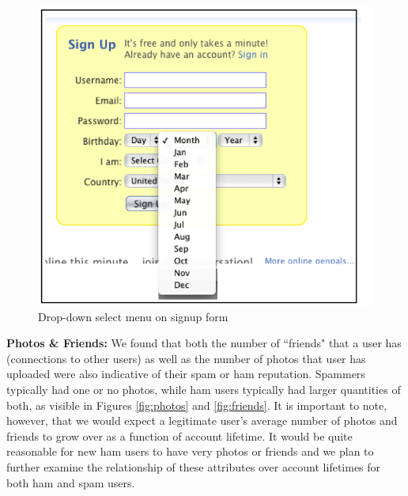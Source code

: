 \documentclass[preprint]{acm_proc_article-sp}
\begin{document}
\begin{figure}[h]
    \centering
    \includegraphics[width=\linewidth]{figures/dropdown.png}
    \caption{Drop-down select menu on signup form}
    \label{fig:drop}
\end{figure}

\textbf{Photos \& Friends:} We found that both the number of ``friends" that a user has (connections 
to other users) as well as the number of photos that user has uploaded were also indicative of their 
spam or ham reputation. Spammers typically had one or no photos, while ham users typically had larger 
quantities of both, as visible in Figures \ref{fig:photos} and \ref{fig:friends}. It is important to note, 
however, that we would expect a legitimate user's average number of photos and friends to grow over 
as a function of account lifetime. It would be quite reasonable for new ham users to have very photos 
or friends and we plan to further examine the relationship of these attributes over account lifetimes 
for both ham and spam users.
\end{document}
